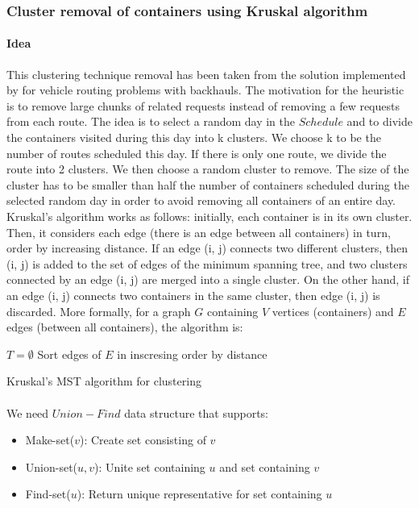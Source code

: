 \documentclass[12pt,a4paper]{article}
\begin{document}
\subsubsection{Cluster removal of containers using Kruskal algorithm}
\paragraph{Idea}This clustering technique removal has been taken from the solution implemented by \cite{RopkeBackauls} for vehicle routing problems with backhauls. The motivation for the heuristic is to remove large chunks of related requests instead of removing a few requests from each route. The idea is to select a random day in the $Schedule$ and to divide the containers visited during this day into k clusters. We choose k to be the number of routes scheduled this day. If there is only one route, we divide the route into 2 clusters. We then choose a random cluster to remove. The size of the cluster has to be smaller than half the number of containers scheduled during the selected random day in order to avoid removing all containers of an entire day. \\ 
Kruskal's algorithm works as follows: initially, each container is in its own cluster. Then, it considers each edge (there is an edge between all containers) in turn, order by increasing distance. If an edge (i, j) connects two different clusters, then (i, j) is added to the set of edges of the minimum spanning tree, and two clusters connected by an edge (i, j) are merged into a single cluster. On the other hand, if an edge (i, j) connects two containers in the same cluster, then edge (i, j) is discarded. More formally, for a graph $G$ containing $V$ vertices (containers) and $E$ edges (between all containers), the algorithm is:

\begin{algorithm}[H]
 $T = \emptyset$\;
 Sort edges of $E$ in inscresing order by distance\;
 \caption{Kruskal's MST algorithm for clustering}
\end{algorithm}
\paragraph{}
We need $Union-Find$ data structure that supports:
  \begin{itemize}
  \item {\sc Make-set}($v$): Create set consisting of $v$
  \item {\sc Union-set}($u,v$): Unite set containing $u$ and set
    containing $v$
  \item {\sc Find-set}($u$): Return unique representative for
    set containing $u$
  \end{itemize}
\end{document}
